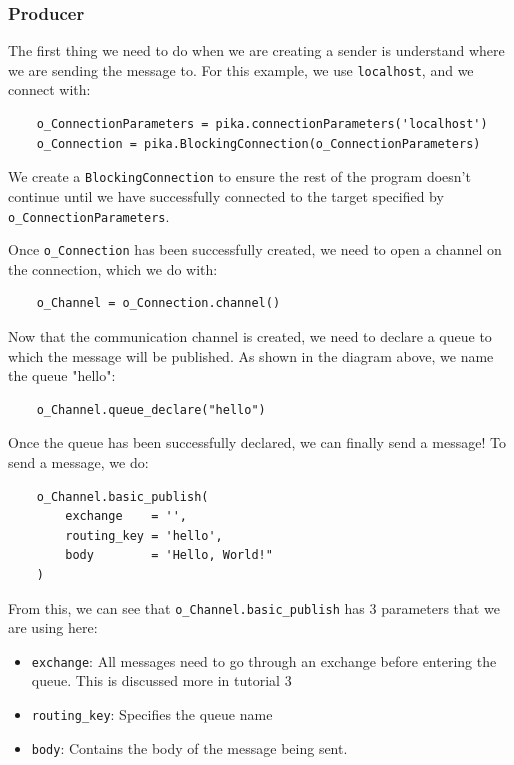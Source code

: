 \documentclass{article}
\begin{document}
\subsubsection{Producer}

The first thing we need to do when we are creating a sender is understand where we are sending the message to. For this example, we use \verb|localhost|, and we connect with:

\begin{verbatim}
    o_ConnectionParameters = pika.connectionParameters('localhost')
    o_Connection = pika.BlockingConnection(o_ConnectionParameters)
\end{verbatim}

We create a \verb|BlockingConnection| to ensure the rest of the program doesn't continue until we have successfully connected to the target specified by \verb|o_ConnectionParameters|.

Once \verb|o_Connection| has been successfully created, we need to open a channel on the connection, which we do with:

\begin{verbatim}
    o_Channel = o_Connection.channel()
\end{verbatim}

Now that the communication channel is created, we need to declare a queue to which the message will be published. As shown in the diagram above, we name the queue "hello":

\begin{verbatim}
    o_Channel.queue_declare("hello")
\end{verbatim}

Once the queue has been successfully declared, we can finally send a message! To send a message, we do:

\begin{verbatim}
    o_Channel.basic_publish(
        exchange    = '',
        routing_key = 'hello',
        body        = 'Hello, World!"
    )
\end{verbatim}

From this, we can see that \verb|o_Channel.basic_publish| has 3 parameters that we are using here:

\begin{itemize}
    \item \verb|exchange|: All messages need to go through an exchange before entering the queue. This is discussed more in tutorial 3
    \item \verb|routing_key|: Specifies the queue name
    \item \verb|body|: Contains the body of the message being sent.
\end{itemize}
\end{document}
